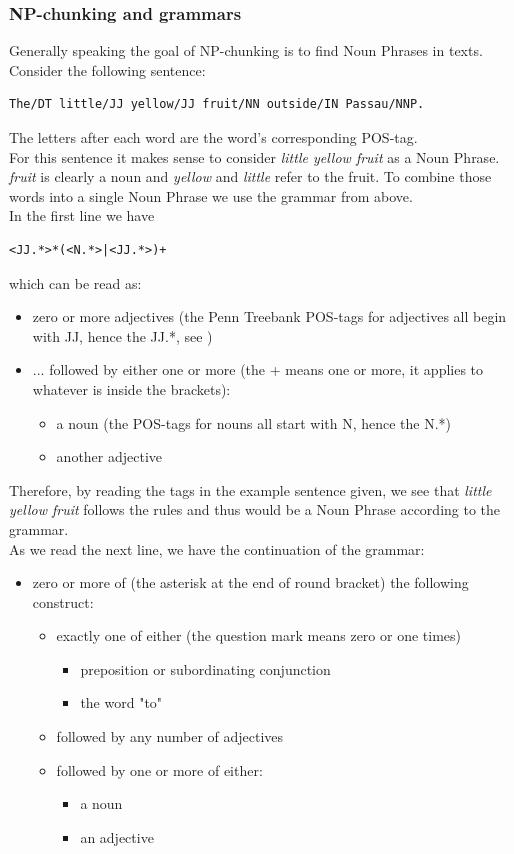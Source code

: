 \subsubsection{NP-chunking and grammars}
Generally speaking the goal of NP-chunking is to find Noun Phrases in texts. Consider the following sentence:
\begin{lstlisting}
The/DT little/JJ yellow/JJ fruit/NN outside/IN Passau/NNP.
\end{lstlisting}
The letters after each word are the word's corresponding POS-tag.\\
For this sentence it makes sense to consider \textit{little yellow fruit} as a Noun Phrase. \textit{fruit} is clearly a noun and \textit{yellow} and \textit{little} refer to the fruit. To combine those words into a single Noun Phrase we use the grammar from above.\\
In the first line we have
\begin{lstlisting}
<JJ.*>*(<N.*>|<JJ.*>)+
\end{lstlisting}
which can be read as:
\begin{itemize}
\item zero or more adjectives (the Penn Treebank POS-tags for adjectives all begin with JJ, hence the JJ.*, see \cite{PennTreebank})
\item ... followed by either one or more (the + means one or more, it applies to whatever is inside the brackets):
    \begin{itemize}
    \item a noun (the POS-tags for nouns all start with N, hence the N.*)
    \item another adjective
    \end{itemize}
\end{itemize}
Therefore, by reading the tags in the example sentence given, we see that \textit{little yellow fruit} follows the rules and thus would be a Noun Phrase according to the grammar.\\
As we read the next line, we have the continuation of the grammar:
\begin{itemize}
\item zero or more of (the asterisk at the end of round bracket) the following construct:
    \begin{itemize}
    \item exactly one of either (the question mark means zero or one times)
        \begin{itemize}
        \item preposition or subordinating conjunction
        \item the word "to"
        \end{itemize}
    \item followed by any number of adjectives
    \item followed by one or more of either:
        \begin{itemize}
        \item a noun
        \item an adjective
        \end{itemize}
    \end{itemize}
\end{itemize}
